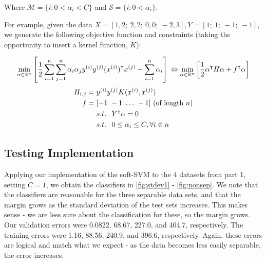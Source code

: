 \documentclass[10pt,letterpaper]{article}
\begin{document}
Where $\mathcal{M} = \{ i : 0 < \alpha_i < C \}$ and $\mathcal{S} = \{ i : 0 < \alpha_i \}$.

For example, given the data $X = [1, 2;\ 2, 2;\ 0, 0;\ -2, 3], Y = [1;\ 1;\ -1;\ -1]$, we generate the following objective function and constraints (taking the opportunity to insert a kernel function, $K$):

\begin{equation}
\min_{\alpha \in \mathbb{R}^n} \left[\dfrac{1}{2} \sum_{i=1}^n \sum_{j=1}^n \alpha_i \alpha_j y^{(i)} y^{(j)} (x^{(i)})^\intercal x^{(j)} - \sum_{i=1}^n \alpha_i \right] \\
\Leftrightarrow \min_{\alpha \in \mathbb{R}^n}\left[\dfrac{1}{2} \alpha^\intercal H \alpha + f^\intercal \alpha\right]
\end{equation}
\begin{align}
H_{i,j} =&\ y^{(i)} y^{(j)} K(x^{(i)},x^{(j)}) \\
f =&\ [-1\ -1\ \ldots\ -1]\ \text{(of length $n$)} \\
&\ s.t. \hspace{.75em} Y^\intercal \alpha = 0 \\
&\ s.t. \hspace{.75em} 0 \le \alpha_i \le C, \forall i \in n
\end{align}

\subsection{Testing Implementation}

Applying our implementation of the soft-SVM to the 4 datasets from part 1, setting $C = 1$, we obtain the classifiers in \ref{fig:stdev1} - \ref{fig:nonsep}. We note that the classifiers are reasonable for the three separable data sets, and that the margin grows as the standard deviation of the test sets increases. This makes sense - we are less sure about the classification for these, so the margin grows. Our validation errors were 0.0822, 68.67, 227.0, and 404.7, respectively. The training errors were 1.16, 88.56, 240.9, and 396.6, respectively. Again, these errors are logical and match what we expect - as the data becomes less easily separable, the error increases.
\end{document}
